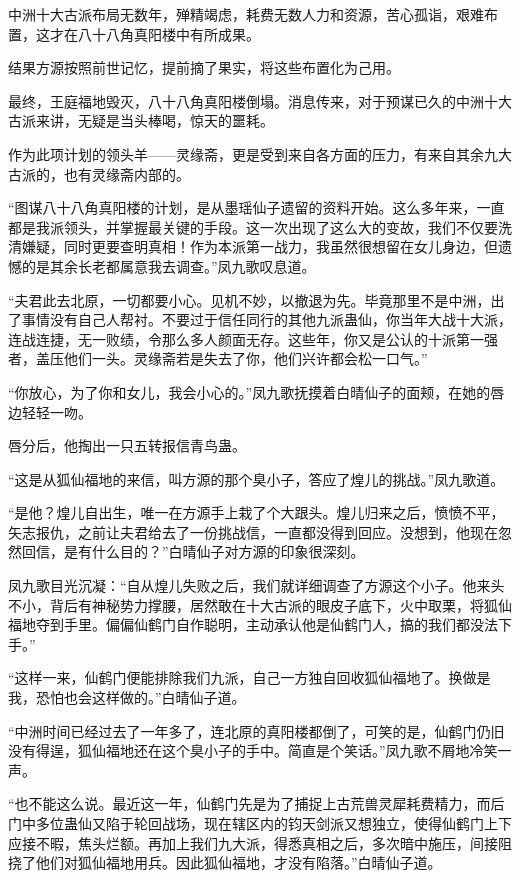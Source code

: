 \begin{this_body}
中洲十大古派布局无数年，殚精竭虑，耗费无数人力和资源，苦心孤诣，艰难布置，这才在八十八角真阳楼中有所成果。

结果方源按照前世记忆，提前摘了果实，将这些布置化为己用。

最终，王庭福地毁灭，八十八角真阳楼倒塌。消息传来，对于预谋已久的中洲十大古派来讲，无疑是当头棒喝，惊天的噩耗。

作为此项计划的领头羊——灵缘斋，更是受到来自各方面的压力，有来自其余九大古派的，也有灵缘斋内部的。

“图谋八十八角真阳楼的计划，是从墨瑶仙子遗留的资料开始。这么多年来，一直都是我派领头，并掌握最关键的手段。这一次出现了这么大的变故，我们不仅要洗清嫌疑，同时更要查明真相！作为本派第一战力，我虽然很想留在女儿身边，但遗憾的是其余长老都属意我去调查。”凤九歌叹息道。

“夫君此去北原，一切都要小心。见机不妙，以撤退为先。毕竟那里不是中洲，出了事情没有自己人帮衬。不要过于信任同行的其他九派蛊仙，你当年大战十大派，连战连捷，无一败绩，令那么多人颜面无存。这些年，你又是公认的十派第一强者，盖压他们一头。灵缘斋若是失去了你，他们兴许都会松一口气。”

“你放心，为了你和女儿，我会小心的。”凤九歌抚摸着白晴仙子的面颊，在她的唇边轻轻一吻。

唇分后，他掏出一只五转报信青鸟蛊。

“这是从狐仙福地的来信，叫方源的那个臭小子，答应了煌儿的挑战。”凤九歌道。

“是他？煌儿自出生，唯一在方源手上栽了个大跟头。煌儿归来之后，愤愤不平，矢志报仇，之前让夫君给去了一份挑战信，一直都没得到回应。没想到，他现在忽然回信，是有什么目的？”白晴仙子对方源的印象很深刻。

凤九歌目光沉凝：“自从煌儿失败之后，我们就详细调查了方源这个小子。他来头不小，背后有神秘势力撑腰，居然敢在十大古派的眼皮子底下，火中取栗，将狐仙福地夺到手里。偏偏仙鹤门自作聪明，主动承认他是仙鹤门人，搞的我们都没法下手。”

“这样一来，仙鹤门便能排除我们九派，自己一方独自回收狐仙福地了。换做是我，恐怕也会这样做的。”白晴仙子道。

“中洲时间已经过去了一年多了，连北原的真阳楼都倒了，可笑的是，仙鹤门仍旧没有得逞，狐仙福地还在这个臭小子的手中。简直是个笑话。”凤九歌不屑地冷笑一声。

“也不能这么说。最近这一年，仙鹤门先是为了捕捉上古荒兽灵犀耗费精力，而后门中多位蛊仙又陷于轮回战场，现在辖区内的钧天剑派又想独立，使得仙鹤门上下应接不暇，焦头烂额。再加上我们九大派，得悉真相之后，多次暗中施压，间接阻挠了他们对狐仙福地用兵。因此狐仙福地，才没有陷落。”白晴仙子道。


\end{this_body}

